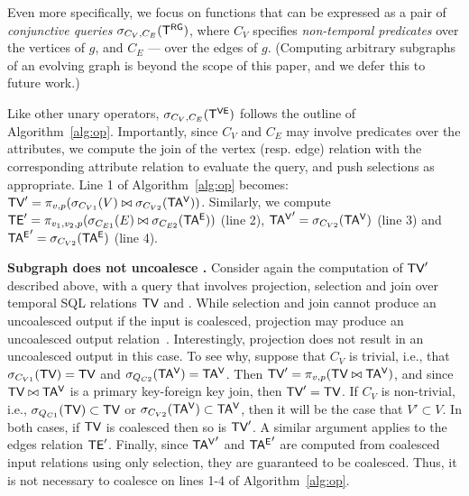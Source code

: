   Even more
specifically, we focus on functions that can be expressed as a pair of
{\em conjunctive queries} $\sigma_{C_V,C_E} (\mathsf{T^{RG}})$, where $C_V$
specifies {\em non-temporal predicates} over the vertices of $g$, and
$C_E$ --- over the edges of $g$. (Computing arbitrary subgraphs of an
evolving graph is beyond the scope of this paper, and we defer this to
future work.)

Like other unary operators, $\sigma_{C_V, C_E} (\mathsf{T^{VE}})$ follows the
outline of Algorithm~\ref{alg:op}.  Importantly, since $C_V$ and $C_E$
may involve predicates over the attributes, we compute the join of the
vertex (resp. edge) relation with the corresponding attribute relation
to evaluate the query, and push selections as appropriate.  Line 1 of
Algorithm~\ref{alg:op} becomes: $\textsf{TV}' = \pi_{v,p} (\sigma_{C_{V1}} (V)
\bowtie \sigma_{C_{V2}} (\mathsf{TA^{V}}))$.  Similarly, we compute $\textsf{TE}' =
\pi_{v_1,v_2,p} (\sigma_{C_{E1}} (E) \bowtie \sigma_{C_{E2}} (\mathsf{TA^{E}}))$
(line 2), $\mathsf{TA^{V}}' = \sigma_{C_{V2}} (\mathsf{TA^{V}})$ (line 3) and $\mathsf{TA^{E}}' =
\sigma_{C_{V2}} (\mathsf{TA^{E}})$ (line 4).

{\bf Subgraph does not uncoalesce \tve.}  Consider again the
computation of $\textsf{TV}'$ described above, with a query that involves
projection, selection and join over temporal SQL relations $\textsf{TV}$ and
\tav.  While selection and join cannot produce an uncoalesced output
if the input is coalesced, projection may produce an uncoalesced
output relation~\cite{DBLP:conf/vldb/BohlenSS96}.  Interestingly,
projection does not result in an uncoalesced output in this case. To
see why, suppose that $C_V$ is trivial, i.e., that $\sigma_{C_{V1}}
(\textsf{TV}) = \textsf{TV}$ and $\sigma_{Q_{C2}} (\mathsf{TA^{V}}) = \mathsf{TA^{V}}$. Then $\textsf{TV}' =
\pi_{v,p} (\textsf{TV} \bowtie \mathsf{TA^{V}})$, and since $\textsf{TV} \bowtie \mathsf{TA^{V}}$ is a
primary key-foreign key join, then $\textsf{TV}' = \textsf{TV}$.  If $C_V$ is
non-trivial, i.e., $\sigma_{Q_{C1}} (\textsf{TV}) \subset \textsf{TV}$ or
$\sigma_{C_{V2}} (\mathsf{TA^{V}}) \subset \mathsf{TA^{V}}$, then it will be the case that
$V' \subset V$.  In both cases, if $\textsf{TV}$ is coalesced then so is
$\textsf{TV}'$.  A similar argument applies to the edges relation $\textsf{TE}'$.
Finally, since $\mathsf{TA^{V}}'$ and $\mathsf{TA^{E}}'$ are computed from coalesced input
relations using only selection, they are guaranteed to be coalesced.
Thus, it is not necessary to coalesce on lines 1-4 of
Algorithm~\ref{alg:op}.

